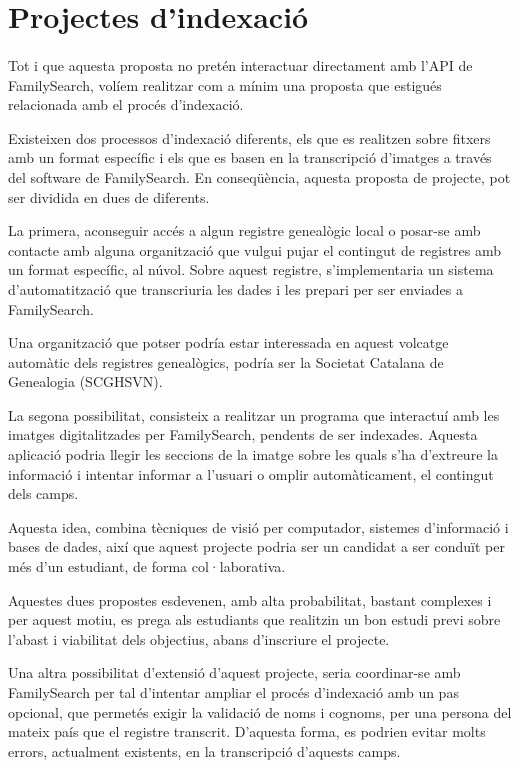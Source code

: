 \section{Projectes d'indexació}

    \paragraph{}
    Tot i que aquesta proposta no pretén interactuar directament amb l'API de Family\-Search, volíem realitzar com a mínim una proposta que estigués relacionada amb el procés d'indexació.

    Existeixen dos processos d'indexació diferents, els que es realitzen sobre fitxers amb un format específic i els que es basen en la transcripció d'imatges a través del software de FamilySearch. En conseqüència, aquesta proposta de projecte, pot ser dividida en dues de diferents.

    La primera, aconseguir accés a algun registre genealògic local o posar-se amb contacte amb alguna organització que vulgui pujar el contingut de registres amb un format específic, al núvol. Sobre aquest registre, s'implementaria un sistema d'automatització que transcriuria les dades i les prepari per ser enviades a FamilySearch.

    Una organització que potser podría estar interessada en aquest volcatge automàtic dels registres genealògics, podría ser la Societat Catalana de Genealogia (SCGHSVN).

    La segona possibilitat, consisteix a realitzar un programa que interactuí amb les imatges digitalitzades per FamilySearch, pendents de ser indexades. Aquesta aplicació podria llegir les seccions de la imatge sobre les quals s'ha d'extreure la informació i intentar informar a l'usuari o omplir automàticament, el contingut dels camps.

    Aquesta idea, combina tècniques de visió per computador, sistemes d'informació i bases de dades, així que aquest projecte podria ser un candidat a ser conduït per més d'un estudiant, de forma col·laborativa.

    Aquestes dues propostes esdevenen, amb alta probabilitat, bastant complexes i per aquest motiu, es prega als estudiants que realitzin un bon estudi previ sobre l'abast i viabilitat dels objectius, abans d'inscriure el projecte.

    Una altra possibilitat d'extensió d'aquest projecte, seria coordinar-se amb FamilySearch per tal d'intentar ampliar el procés d'indexació amb un pas opcional, que permetés exigir la validació de noms i cognoms, per una persona del mateix país que el registre transcrit. D'aquesta forma, es podrien evitar molts errors, actualment existents, en la transcripció d'aquests camps.
